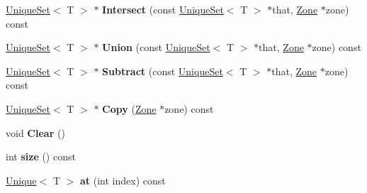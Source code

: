 \begin{DoxyCompactItemize}
\item 
\hyperlink{classv8_1_1internal_1_1_unique_set}{Unique\+Set}$<$ T $>$ $\ast$ {\bfseries Intersect} (const \hyperlink{classv8_1_1internal_1_1_unique_set}{Unique\+Set}$<$ T $>$ $\ast$that, \hyperlink{classv8_1_1internal_1_1_zone}{Zone} $\ast$zone) const \hypertarget{classv8_1_1internal_1_1_unique_set_aedb925c09ad86ad7a97f6dd002be339b}{}\label{classv8_1_1internal_1_1_unique_set_aedb925c09ad86ad7a97f6dd002be339b}

\item 
\hyperlink{classv8_1_1internal_1_1_unique_set}{Unique\+Set}$<$ T $>$ $\ast$ {\bfseries Union} (const \hyperlink{classv8_1_1internal_1_1_unique_set}{Unique\+Set}$<$ T $>$ $\ast$that, \hyperlink{classv8_1_1internal_1_1_zone}{Zone} $\ast$zone) const \hypertarget{classv8_1_1internal_1_1_unique_set_a56e2bee8e5377fe6f52ebc24986b1559}{}\label{classv8_1_1internal_1_1_unique_set_a56e2bee8e5377fe6f52ebc24986b1559}

\item 
\hyperlink{classv8_1_1internal_1_1_unique_set}{Unique\+Set}$<$ T $>$ $\ast$ {\bfseries Subtract} (const \hyperlink{classv8_1_1internal_1_1_unique_set}{Unique\+Set}$<$ T $>$ $\ast$that, \hyperlink{classv8_1_1internal_1_1_zone}{Zone} $\ast$zone) const \hypertarget{classv8_1_1internal_1_1_unique_set_a05bc15b02705024fde8521bba1566dce}{}\label{classv8_1_1internal_1_1_unique_set_a05bc15b02705024fde8521bba1566dce}

\item 
\hyperlink{classv8_1_1internal_1_1_unique_set}{Unique\+Set}$<$ T $>$ $\ast$ {\bfseries Copy} (\hyperlink{classv8_1_1internal_1_1_zone}{Zone} $\ast$zone) const \hypertarget{classv8_1_1internal_1_1_unique_set_aa294e8e86ec8f82947a1f3fb07065d9d}{}\label{classv8_1_1internal_1_1_unique_set_aa294e8e86ec8f82947a1f3fb07065d9d}

\item 
void {\bfseries Clear} ()\hypertarget{classv8_1_1internal_1_1_unique_set_a7eadf6ca19ba49f2b75f4cf2928a0879}{}\label{classv8_1_1internal_1_1_unique_set_a7eadf6ca19ba49f2b75f4cf2928a0879}

\item 
int {\bfseries size} () const \hypertarget{classv8_1_1internal_1_1_unique_set_a45f208855ca733730dc5e7adf3679de5}{}\label{classv8_1_1internal_1_1_unique_set_a45f208855ca733730dc5e7adf3679de5}

\item 
\hyperlink{classv8_1_1internal_1_1_unique}{Unique}$<$ T $>$ {\bfseries at} (int index) const \hypertarget{classv8_1_1internal_1_1_unique_set_a61b1f20596d49bcec8ea3ea33d8b1407}{}\label{classv8_1_1internal_1_1_unique_set_a61b1f20596d49bcec8ea3ea33d8b1407}

\end{DoxyCompactItemize}
